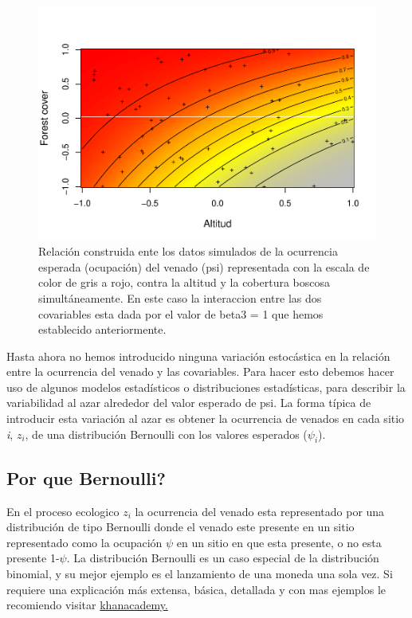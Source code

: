 \documentclass[]{book}
\begin{document}
\begin{figure}[htbp]
\centering
\includegraphics{Simul-Machalilla-book_files/figure-latex/gpagh3-1.pdf}
\caption{\label{fig:gpagh3}Relación construida ente los datos simulados de
la ocurrencia esperada (ocupación) del venado (psi) representada con la
escala de color de gris a rojo, contra la altitud y la cobertura boscosa
simultáneamente. En este caso la interaccion entre las dos covariables
esta dada por el valor de beta3 = 1 que hemos establecido
anteriormente.}
\end{figure}

Hasta ahora no hemos introducido ninguna variación estocástica en la
relación entre la ocurrencia del venado y las covariables. Para hacer
esto debemos hacer uso de algunos modelos estadísticos o distribuciones
estadísticas, para describir la variabilidad al azar alrededor del valor
esperado de psi. La forma típica de introducir esta variación al azar es
obtener la ocurrencia de venados en cada sitio \emph{i}, \(z _{i}\), de
una distribución Bernoulli con los valores esperados (\(\psi _{i}\)).

\subsection{Por que Bernoulli?}\label{por-que-bernoulli}

En el proceso ecologico \(z _{i}\) la ocurrencia del venado esta
representado por una distribución de tipo Bernoulli donde el venado este
presente en un sitio representado como la ocupación \(\psi\) en un sitio
en que esta presente, o no esta presente 1-\(\psi\). La distribución
Bernoulli es un caso especial de la distribución binomial, y su mejor
ejemplo es el lanzamiento de una moneda una sola vez. Si requiere una
explicación más extensa, básica, detallada y con mas ejemplos le
recomiendo visitar
\href{https://es.khanacademy.org/math/probability/statistics-inferential/margin-of-error/v/mean-and-variance-of-bernoulli-distribution-example}{khanacademy.}
\end{document}
